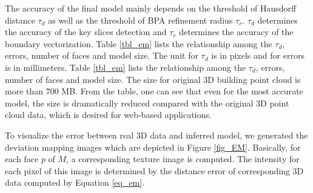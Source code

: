 \documentclass[12pt,letterpaper]{article}
\begin{document}
The accuracy of the final model mainly depends on the threshold of Hausdorff distance $\tau_d$ as
well as the threshold of BPA refinement radius $\tau_r$. $\tau_d$ determines the accuracy of the key slices detection
and $\tau_r$ determines the accuracy of the boundary vectorization.
Table \ref{tbl_em} lists the relationship among the $\tau_d$, errors, number of faces and model size.
The unit for $\tau_d$ is in pixels and for errors is in millimeters.
Table \ref{tbl_em} lists the relationship among the $\tau_d$, errors, number of faces and model size.
The size for original 3D building point cloud is more than 700 MB. From the table, one can see that even
for the most accurate model, the size is dramatically reduced compared with the original 3D point cloud data,
which is desired for web-based applications.

To visualize the error between real 3D data and inferred model, we generated the deviation
mapping images which are depicted in Figure \ref{fig_EM}. Basically, for each face $p$
of $M$, a corresponding texture image is computed. The intensity for each pixel of this image
is determined by the distance error of corresponding 3D data computed by Equation \ref{eq_em}.
\end{document}
